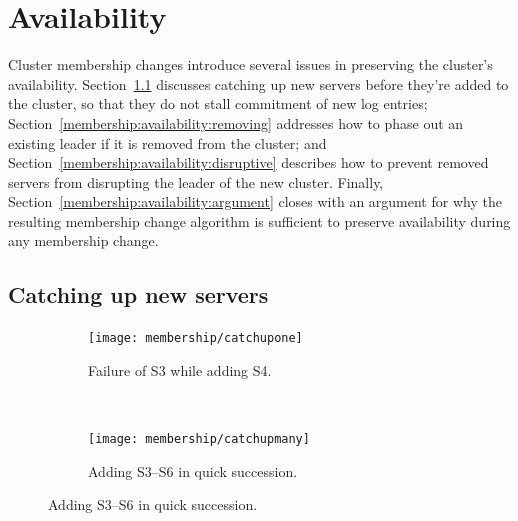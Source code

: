 \section{Availability}
\label{membership:availability}

Cluster membership changes introduce several issues in preserving the
cluster's availability.
%
Section~\ref{membership:availability:catchup} discusses catching up new
servers before they're added to the cluster, so that they do not stall
commitment of new log entries;
%
Section~\ref{membership:availability:removing} addresses how to phase
out an existing leader if it is removed from the cluster; and
%
Section~\ref{membership:availability:disruptive} describes how to
prevent removed servers from disrupting the leader of the new cluster.
%
Finally, Section~\ref{membership:availability:argument} closes with an
argument for why the resulting membership change algorithm is sufficient
to preserve availability during any membership change.


\subsection{Catching up new servers}
\label{membership:availability:catchup}

\begin{figure}
\centering

\begin{subfigure}{.45\textwidth}
\centering
\texttt{[image: membership/catchupone]}
\caption{
Failure of S3 while adding S4.
}
\label{fig:membership:catchupone}
\end{subfigure}
~
\begin{subfigure}{.45\textwidth}
\centering
\texttt{[image: membership/catchupmany]}
\caption{
Adding S3--S6 in quick succession.
}
\label{fig:membership:catchupmany}
\end{subfigure}

\end{figure}

